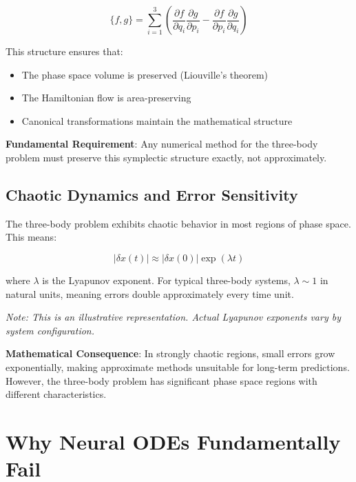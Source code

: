\documentclass[11pt,a4paper]{article}
\begin{document}
\begin{equation}
\{f, g\} = \sum_{i=1}^{3} \left(\frac{\partial f}{\partial q_i} \frac{\partial g}{\partial p_i} - \frac{\partial f}{\partial p_i} \frac{\partial g}{\partial q_i}\right)
\end{equation}

This structure ensures that:
\begin{itemize}
    \item The phase space volume is preserved (Liouville's theorem)
    \item The Hamiltonian flow is area-preserving
    \item Canonical transformations maintain the mathematical structure
\end{itemize}

\textbf{Fundamental Requirement}: Any numerical method for the three-body problem must preserve this symplectic structure exactly, not approximately.

\subsection{Chaotic Dynamics and Error Sensitivity}

The three-body problem exhibits chaotic behavior in most regions of phase space. This means:

\begin{equation}
|\delta x(t)| \approx |\delta x(0)| \exp(\lambda t)
\end{equation}

where $\lambda$ is the Lyapunov exponent. For typical three-body systems, $\lambda \sim 1$ in natural units, meaning errors double approximately every time unit.

\begin{center}
\end{center}
\vspace{0.2cm}
\textit{Note: This is an illustrative representation. Actual Lyapunov exponents vary by system configuration.}

\textbf{Mathematical Consequence}: In strongly chaotic regions, small errors grow exponentially, making approximate methods unsuitable for long-term predictions. However, the three-body problem has significant phase space regions with different characteristics.

\section{Why Neural ODEs Fundamentally Fail}
\end{document}
